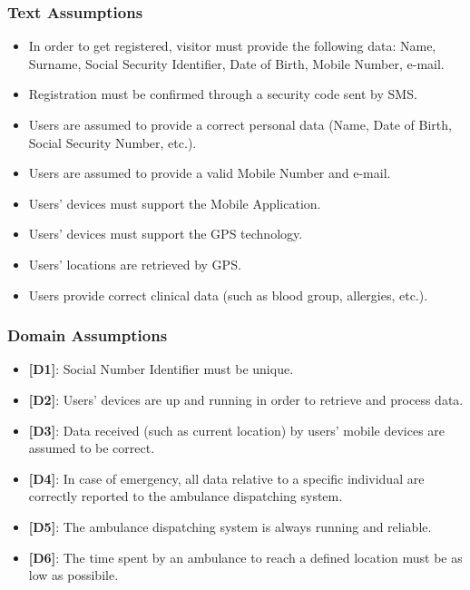 \documentclass[12pt,a4paper]{article}
\begin{document}
			\subsubsection{Text Assumptions}
			\begin{itemize}
				\item In order to get registered, visitor must provide the following data: Name, Surname, Social Security Identifier, Date of Birth, Mobile Number, e-mail.
				\item Registration must be confirmed through a security code sent by SMS.
				\item Users are assumed to provide a correct personal data (Name, Date of Birth, Social Security Number, etc.).
				\item Users are assumed to provide a valid Mobile Number and e-mail.
				\item Users' devices must support the Mobile Application.
				\item Users' devices must support the GPS technology.
				\item Users' locations are retrieved by GPS.
				\item Users provide correct clinical data (such as blood group, allergies, etc.).
			\end{itemize}
			\subsubsection{Domain Assumptions}
			\begin{itemize} 
				\item {\textbf[}\textbf{D1}{\textbf]}: Social Number Identifier must be unique.
        \item {\textbf[}\textbf{D2}{\textbf]}: Users' devices are up and running in order to retrieve and process data. 
        \item {\textbf[}\textbf{D3}{\textbf]}: Data received (such as current location) by users' mobile devices are assumed to be correct.
        \item {\textbf[}\textbf{D4}{\textbf]}: In case of emergency, all data relative to a specific individual are correctly reported to the ambulance dispatching system.
        \item {\textbf[}\textbf{D5}{\textbf]}: The ambulance dispatching system is always running and reliable.
        \item {\textbf[}\textbf{D6}{\textbf]}: The time spent by an ambulance to reach a defined location must be as low as possibile.
			\end{itemize}
\end{document}
